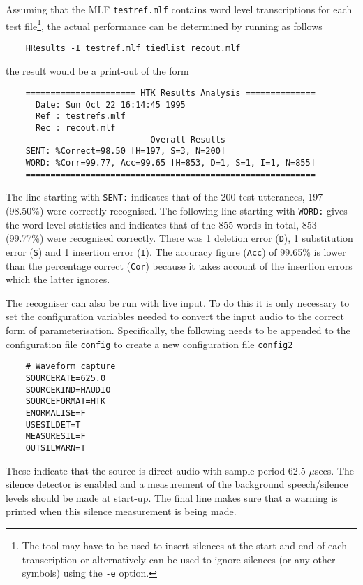 Assuming that the MLF \texttt{testref.mlf} contains word level transcriptions
for each test file\footnote{The  tool may have to be used to insert silences 
at the start and end of each transcription or alternatively
 can be used to ignore silences (or any other symbols) using
the \texttt{-e} option.}, the actual
performance can be determined by running 
 as follows
\begin{verbatim}
    HResults -I testref.mlf tiedlist recout.mlf
\end{verbatim}
the result would be a print-out of the form
\begin{verbatim}
    ====================== HTK Results Analysis ==============
      Date: Sun Oct 22 16:14:45 1995
      Ref : testrefs.mlf
      Rec : recout.mlf
    ------------------------ Overall Results -----------------
    SENT: %Correct=98.50 [H=197, S=3, N=200]
    WORD: %Corr=99.77, Acc=99.65 [H=853, D=1, S=1, I=1, N=855]
    ==========================================================
\end{verbatim}
The line starting with \texttt{SENT:} indicates that of the 200 test utterances,
197  (98.50\%) were correctly recognised.  The following line starting with \texttt{WORD:} 
gives the word level statistics and indicates that of the 855 words in total,
853 (99.77\%) were recognised correctly.  There was 1 deletion error (\texttt{D}), 
1 substitution
error (\texttt{S}) and 1 insertion error (\texttt{I}).  The accuracy figure (\texttt{Acc})
of 99.65\% is lower than the percentage correct (\texttt{Cor}) because it takes
account of the insertion errors which the latter ignores.



The recogniser can also be run with live input.  
To do this it is only
necessary to set the configuration variables needed to convert the input
audio to the correct form of  parameterisation.  Specifically, the following
needs to be appended to the configuration file \texttt{config} to
create a new configuration file \texttt{config2}
\begin{verbatim}
    # Waveform capture
    SOURCERATE=625.0
    SOURCEKIND=HAUDIO
    SOURCEFORMAT=HTK
    ENORMALISE=F
    USESILDET=T
    MEASURESIL=F
    OUTSILWARN=T
\end{verbatim}
These indicate that the source is direct audio with sample period 62.5
$\mu$secs.  The silence detector is enabled and a measurement of the background
speech/silence levels should be made at start-up.  The final line makes sure
that a warning is printed when this silence measurement is being made.

